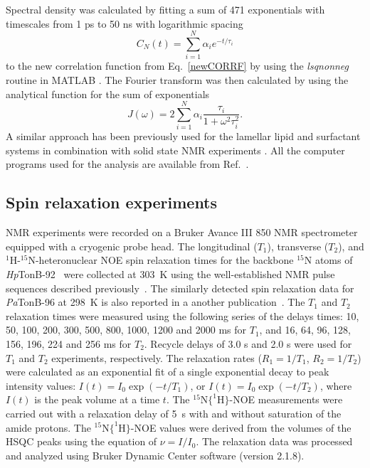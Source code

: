 \documentclass[journal=jpcbfk,manuscript=article]{achemso}
\begin{document}
Spectral density was calculated by fitting a
sum of 471 exponentials with timescales from 1 ps to 50 ns
with logarithmic spacing
\begin{equation}\label{gprime_fit}
C_N(t)=\sum_{i=1}^{N}\alpha_i e^{-t/\tau_i}
\end{equation}
to the new correlation function from Eq.~\ref{newCORRF}
by using the {\it lsqnonneg} routine in MATLAB \cite{matlab}.
The Fourier transform was then calculated by using the analytical function
for the sum of exponentials 
\begin{equation}\label{FTanal}
J(\omega) =  2 \sum_{i=1}^{N}\alpha_i\frac{\tau_i}{1+\omega^2\tau_i^2}.
\end{equation}
A similar approach has been previously used for the lamellar lipid and surfactant
systems in combination with solid state NMR experiments \cite{nowacka13,ferreira15}.
All the computer programs used for the analysis are available from Ref.~.

\subsection{Spin relaxation experiments}
NMR experiments were recorded on a Bruker Avance III 850 NMR spectrometer equipped
with a cryogenic probe head. The longitudinal ($T_1$), transverse ($T_2$), and
$^1$H-$^{15}$N-heteronuclear NOE spin relaxation times
for the backbone $^{15}$N atoms of {\it Hp}TonB-92~\cite{ciragan16}
were collected at 303~K using the well-established NMR pulse sequences described previously~\cite{kay89,barbato92,farrow94}.
The similarly detected spin relaxation data for {\it Pa}TonB-96 at 298~K is also reported in a another publication~\cite{oeemig17}. 
The $T_1$ and $T_2$ relaxation times were measured using the following series of the delays
times: 10, 50, 100, 200, 300, 500, 800, 1000, 1200 and 2000 ms for $T_1$,
and 16, 64, 96, 128, 156, 196, 224 and 256 ms for $T_2$.
Recycle delays of 3.0 s and 2.0 s were used for $T_1$ and $T_2$
experiments, respectively.
The relaxation rates ($R_1=1/T_1$, $R_2=1/T_2$)
were calculated as an exponential fit of a single exponential decay to peak intensity
values: $I(t) = I_0 \exp(-t/T_1)$, or $I(t)=I_0 \exp(-t/T_2)$,
where $I(t)$ is the peak volume at a time $t$. The $^{15}$N$ \{ ^1$H$ \} $-NOE measurements were carried out
with a relaxation delay of 5~s with and without saturation of the amide protons.
The $^{15}$N$ \{ ^1$H$ \} $-NOE values were derived from the volumes of the HSQC peaks using the
equation of $\nu=I/I_0$. The relaxation data was processed and analyzed using
Bruker Dynamic Center software (version 2.1.8).
\end{document}
